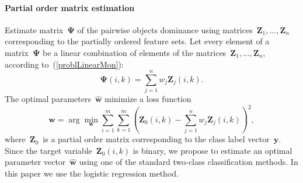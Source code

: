 \documentclass[12pt,preprint]{elsarticle}
\newcommand{\by}{\mathbf{y}}
\newcommand{\bw}{\mathbf{w}}
\newcommand{\bZ}{\mathbf{Z}}
\newcommand{\bPsi}{\boldsymbol{\Psi}}
\begin{document}
\paragraph{Partial order matrix estimation}
Estimate matrix~$\bPsi$ of the pairwise objects dominance using matrices~$\bZ_1,...,\bZ_n$ corresponding to the partially ordered feature sets. Let every element of a matrix~$\bPsi$ be a linear combination of elements of the matrices~$\bZ_1,...,\bZ_n$, according to~(\ref{problLinearMon}):
\[
\bPsi(i,k)=\sum\limits_{j=1}^n w_j\bZ_j(i,k).
\]
The optimal parameters~$\hat{\bw}$ minimize a loss function
\[
\hat{\bw} = \arg\min\limits_{\bw}\sum\limits_{i=1}^m\sum\limits_{k=1}^m\left(\bZ_0(i,k) - \sum\limits_{j=1}^n w_j\bZ_j(i,k)\right)^2,
\]
where~$\bZ_0$~is a partial order matrix corresponding to the class label vector~$\by$.
Since the target variable~$\bZ_0(i,k)$ is binary, we propose to estimate an optimal parameter vector~$\hat{\bw}$ using one of the standard two-class classification methods. In this paper we use the logistic regression method.
\end{document}
